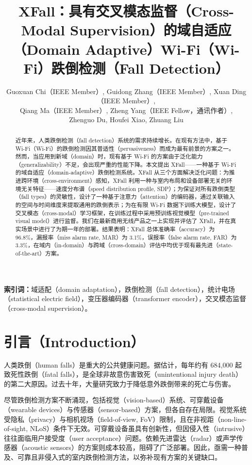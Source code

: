 \documentclass[UTF8,twocolumn]{ctexart}
\title{\bfseries XFall：具有交叉模态监督（Cross-Modal Supervision）的域自适应（Domain Adaptive）Wi\!-\!Fi（Wi-Fi）跌倒检测（Fall Detection）}
\author{Guoxuan Chi（IEEE Member）, Guidong Zhang（IEEE Member）, Xuan Ding（IEEE Member）,\\
Qiang Ma（IEEE Member）, Zheng Yang（IEEE Fellow，通讯作者）,\\
Zhenguo Du, Houfei Xiao, Zhuang Liu}
\date{}
\begin{document}
\maketitle

\begin{abstract}
近年来，人类跌倒检测（fall detection）系统的需求持续增长。在现有方法中，基于 Wi\!-\!Fi（Wi-Fi）的跌倒检测因其普适性（pervasiveness）而成为最有前景的方案之一。然而，当应用到新域（domain）时，现有基于 Wi\!-\!Fi 的方案由于泛化能力（generalizability）不足，会出现严重的性能下降。本文提出 XFall——一种基于 Wi\!-\!Fi 的域自适应（domain-adaptive）跌倒检测系统。XFall 从三个方面解决泛化问题：为推进跨环境（cross-environment）感知，XFall 利用一种与室内布局和设备部署无关的环境无关特征——速度分布谱（speed distribution profile, SDP）；为保证对所有跌倒类型（fall types）的灵敏性，设计了一种基于注意力（attention）的编码器，通过关联输入的空间与时间维度来提取通用的跌倒表示；为在有限 Wi\!-\!Fi 数据下训练大模型，设计了交叉模态（cross-modal）学习框架，在训练过程中采用预训练视觉模型（pre-trained visual model）进行监督。我们在最新商用无线产品之一上实现并评估了 XFall，并在真实场景中进行了为期一年的部署。结果表明：XFall 总体准确率（accuracy）为 96.8\%，漏报率（miss alarm rate, MAR）为 3.1\%，误报率（false alarm rate, FAR）为 3.3\%，在域内（in-domain）与跨域（cross-domain）评估中均优于现有最先进（state-of-the-art）方案。
\end{abstract}

\noindent\textbf{索引词：}域适配（domain adaptation），跌倒检测（fall detection），统计电场（statistical electric field），变压器编码器（transformer encoder），交叉模态监督（cross-modal supervision）。

\section{引言（Introduction）}
人类跌倒（human falls）是重大的公共健康问题。据估计，每年约有 684,000 起致死性跌倒（fatal falls），是全球非故意伤害致死（unintentional injury death）的第二大原因\cite{ref1}。过去十年，大量研究致力于降低意外跌倒带来的死亡与伤害。

尽管跌倒检测方案不断涌现，包括视觉（vision-based）系统、可穿戴设备（wearable devices）与传感器（sensor-based）方案，但各自存在局限。视觉系统\cite{ref2,ref3,ref4}受隐私（privacy）与相机视场（field-of-view, FoV）限制，且在非视距（non-line-of-sight, NLoS）条件下无效。可穿戴设备\cite{ref5,ref6}虽具有创新性，但因侵入性（intrusive）往往面临用户接受度（user acceptance）问题。依赖先进雷达（radar）\cite{ref7}或声学传感器（acoustic sensors）\cite{ref8}的方案则成本较高，阻碍了广泛部署。因此，亟需一种普及、可靠且非侵入式的室内跌倒检测方法，以弥补现有方案的关键缺口。
\end{document}
